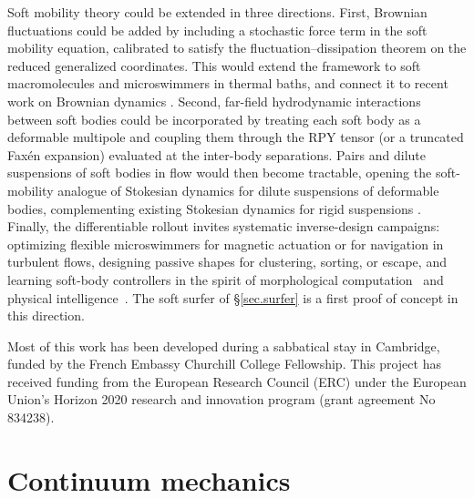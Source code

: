 \documentclass[aps,prfluids,groupedaddress]{revtex4-2}
\begin{document}
Soft mobility theory could be extended in three directions. First, Brownian fluctuations could be added by including a stochastic force term in the soft mobility equation, calibrated to satisfy the fluctuation--dissipation theorem on the reduced generalized coordinates. This would extend the framework to soft macromolecules and microswimmers in thermal baths, and connect it to recent work on Brownian dynamics \cite{Cichocki2021,Funkenbusch2024}. 
Second, far-field hydrodynamic interactions between soft bodies could be incorporated by treating each soft body as a deformable multipole and coupling them through the RPY tensor (or a truncated Fax\'en expansion) evaluated at the inter-body separations. Pairs and dilute suspensions of soft bodies in flow would then become tractable, opening the soft-mobility analogue of Stokesian dynamics for dilute suspensions of deformable bodies, complementing existing Stokesian dynamics for rigid suspensions \cite{Brady1988,Fiore2019}.
Finally, the differentiable rollout invites systematic inverse-design campaigns: optimizing flexible microswimmers for magnetic actuation or for navigation in turbulent flows, designing passive shapes for clustering, sorting, or escape, and learning soft-body controllers in the spirit of morphological computation~\cite{Pfeifer2014,Hauser2014} and physical intelligence~\cite{Sitti2021}. The soft surfer of \S\ref{sec.surfer} is a first proof of concept in this direction.


\begin{acknowledgments}
Most of this work has been developed during a sabbatical stay in Cambridge, funded by the French Embassy Churchill College Fellowship.
This project has received funding from the European Research Council (ERC) under the European Union’s Horizon 2020 research and innovation program (grant agreement No 834238).
\end{acknowledgments}


\appendix

\section{Continuum mechanics}

\end{document}
